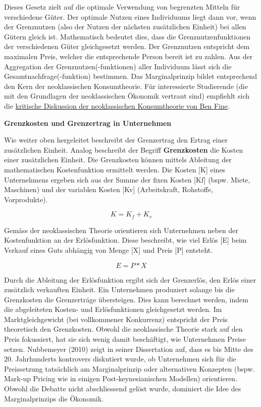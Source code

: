 \documentclass[
  nswissgerman,
  a4paper,
  DIV=11,
  numbers=noendperiod,
  oneside,
  openany]{scrreprt}
\begin{document}
\begin{tcolorbox}
Dieses Gesetz zielt auf die optimale Verwendung von begrenzten Mitteln
für verschiedene Güter. Der optimale Nutzen eines Individuums liegt dann
vor, wenn der Grenznutzen (also der Nutzen der nächsten zusätzlichen
Einheit) bei allen Gütern gleich ist. Mathematisch bedeutet dies, dass
die Grenznutzenfunktionen der verschiedenen Güter gleichgesetzt werden.
Der Grenznutzen entspricht dem maximalen Preis, welcher die
entsprechende Person bereit ist zu zahlen. Aus der Aggregation der
Grenznutzen(-funktionen) aller Individuum lässt sich die
Gesamtnachfrage(-funktion) bestimmen. Das Marginalprinzip bildet
entsprechend den Kern der neoklassischen Konsumtheorie. Für
interessierte Studierende (die mit den Grundlagen der neoklassischen
Ökonomik vertraut sind) empfiehlt sich die
\href{https://ilias.unibe.ch/go/file/3803482}{kritische Diskussion der
neoklassischen Konsumtheorie von Ben Fine}.

\textbf{Grenzkosten und Grenzertrag in Unternehmen}

Wie weiter oben hergeleitet beschreibt der Grenzertrag den Ertrag einer
zusätzlichen Einheit. Analog beschreibt der Begriff \textbf{Grenzkosten}
die Kosten einer zusätzlichen Einheit. Die Grenzkosten können mittels
Ableitung der mathematischen Kostenfunktion ermittelt werden. Die Kosten
{[}K{]} eines Unternehmens ergeben sich aus der Summe der fixen Kosten
{[}Kf{]} (bspw. Miete, Maschinen) und der variablen Kosten {[}Kv{]}
(Arbeitskraft, Rohstoffe, Vorprodukte).

\[K = K_f + K_v\]

Gemäss der neoklassischen Theorie orientieren sich Unternehmen neben der
Kostenfunktion an der Erlösfunktion. Diese beschreibt, wie viel Erlös
{[}E{]} beim Verkauf eines Guts abhängig von Menge {[}X{]} und Preis
{[}P{]} entsteht.

\[E = P * X\]

Durch die Ableitung der Erlösfunktion ergibt sich der Grenzerlös, den
Erlös einer zusätzlich verkauften Einheit. Ein Unternehmen produziert
solange bis die Grenzkosten die Grenzerträge übersteigen. Dies kann
berechnet werden, indem die abgeleiteten Kosten- und Erlösfunktionen
gleichgesetzt werden. Im Marktgleichgewicht (bei vollkommener
Konkurrenz) entspricht der Preis theoretisch den Grenzkosten. Obwohl die
neoklassische Theorie stark auf den Preis fokussiert, hat sie sich wenig
damit beschäftigt, wie Unternehmen Preise setzen. Nubbemeyer (2010)
zeigt in seiner Dissertation auf, dass es bis Mitte des 20. Jahrhunderts
kontrovers diskutiert wurde, ob Unternehmen sich für die Preissetzung
tatsächlich am Marginalprinzip oder alternativen Konzepten (bspw.
Mark-up Pricing wie in einigen Post-keynesianischen Modellen)
orientieren. Obwohl die Debatte nicht abschliessend gelöst wurde,
dominiert die Idee des Marginalprinzips die Ökonomik.

\end{tcolorbox}
\end{document}
